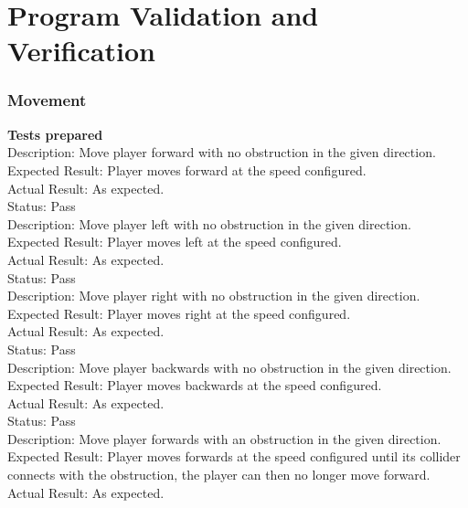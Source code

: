\documentclass[11pt,a4paper]{article}
\begin{document}
\section{Program Validation and Verification}
\subsubsection{Movement}
\textbf{Tests prepared}\\
Description: Move player forward with no obstruction in the given direction.\\
Expected Result: Player moves forward at the speed configured.\\
Actual Result: As expected.\\
Status: Pass
\smallskip\\
Description: Move player left with no obstruction in the given direction.\\
Expected Result: Player moves left at the speed configured.\\
Actual Result: As expected.\\
Status: Pass
\smallskip\\
Description: Move player right with no obstruction in the given direction.\\
Expected Result: Player moves right at the speed configured.\\
Actual Result: As expected.\\
Status: Pass
\smallskip\\
Description: Move player backwards with no obstruction in the given direction.\\
Expected Result: Player moves backwards at the speed configured.\\
Actual Result: As expected.\\
Status: Pass
\smallskip\\
Description: Move player forwards with an obstruction in the given direction.\\
Expected Result: Player moves forwards at the speed configured until its collider connects with the obstruction, the player can then no longer move forward.\\
Actual Result: As expected.\\
\end{document}
